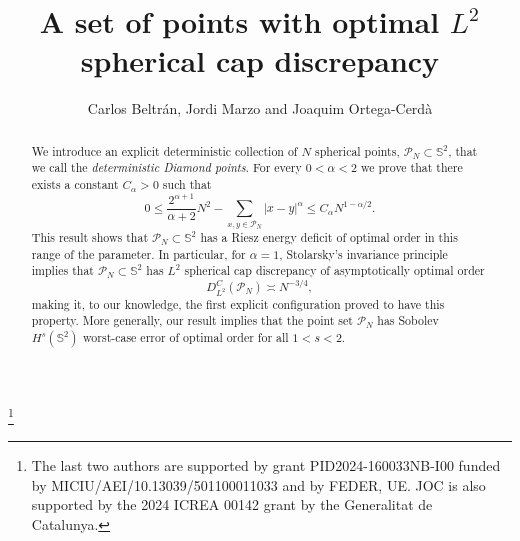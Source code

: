 \documentclass[11pt]{amsart}
\newcommand{\Sph}{\mathbb S^2}
\newcommand{\cP}{\mathcal P}
\begin{document}
\title{A set of points with optimal $L^2$ spherical cap discrepancy}


\author{Carlos Beltr\'an, Jordi Marzo and Joaquim Ortega-Cerd\`a}


\address{ Departamento de Matem\'aticas, Estad\'{\i}stica y Computaci\'on,
Universidad de Can\-ta\-bria, Avd. Los Castros s/n, 39005, Santander, Spain}


\address{Departament de Matem\`atiques i Inform\`atica, Universitat de
Barcelona \& Barcelona Graduate School of Mathematics, Gran Via 585, 08007,
Barcelona, Spain}

\address{Departament de Matem\`atiques i Inform\`atica, Universitat de
Barcelona \& Barcelona Graduate School of Mathematics, Gran Via 585, 08007,
Barcelona, Spain}




\thanks{The last two authors are supported by grant PID2024-160033NB-I00 funded by MICIU/AEI/10.13039/501100011033 and by FEDER, UE. JOC is also supported by the 2024 ICREA 00142 grant by the Generalitat de Catalunya.}


\begin{abstract}

We introduce an explicit deterministic collection of $N$ spherical points, $\cP_N\subset\mathbb S^2$, that we call the {\em deterministic Diamond points}. For every $0<\alpha<2$ we prove that there exists a constant $C_\alpha>0$ such that
\[ 0\leq \frac{2^{\alpha+1}}{\alpha+2}N^2-\sum_{x,y\in\cP_N}|x-y|^\alpha \le C_\alpha N^{1-\alpha/2}. \]
This result shows that $\cP_N\subset\mathbb S^2$ has a Riesz energy deficit of optimal order in this range of the parameter. In particular, for $\alpha=1$, Stolarsky's invariance principle implies that $\cP_N\subset\mathbb S^2$ has $L^2$ spherical cap discrepancy of asymptotically optimal order
\[ D_{L^2}^C(\mathcal P_N)\asymp N^{-3/4}, \]
making it, to our knowledge, the first explicit configuration proved to have this property. More generally, our result implies that the point set $\cP_N$  has Sobolev $H^{s}(\Sph)$ worst-case error of optimal order for all $1<s<2$.
\end{abstract}
\maketitle
\end{document}
